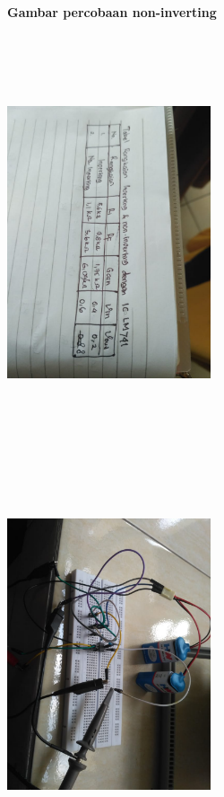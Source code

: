 \documentclass[12pt,a4paper]{article}
\begin{document}
\newpage
\begin{figure}
\paragraph{Gambar percobaan non-inverting}
\paragraph{ }
\begin{center}

\includegraphics[width=6cm, height=12cm]{noninverting1.png}

\includegraphics[width=6cm, height=12cm]{noninverting2.png}

\end{center}
\end{figure}
\vspace{2cm}
\end{document}
